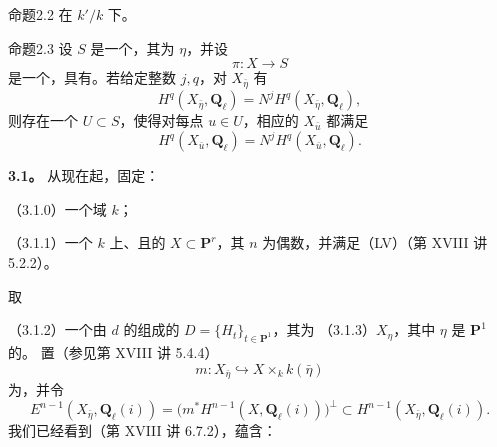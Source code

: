 \begin{SGAresult}{命题}{2.2}
在 $k'/k$ 下。
\end{SGAresult}
\begin{SGAresult}{命题}{2.3}
设 $S$ 是一个，其为 $\eta$，并设
\[\pi:X\longrightarrow S\]
是一个，具有。若给定整数 $j,q$，对 $X_{\bar\eta}$ 有
\begin{equation}\tag{2.3.1}
H^q(X_{\bar\eta},\mathbf Q_\ell)=N^jH^q(X_{\bar\eta},\mathbf Q_\ell),
\end{equation}
则存在一个 $U\subset S$，使得对每点 $u\in U$，相应的 $X_{\bar u}$ 都满足
\begin{equation}\tag{2.3.2}
H^q(X_{\bar u},\mathbf Q_\ell)=N^jH^q(X_{\bar u},\mathbf Q_\ell).
\end{equation}
\end{SGAresult}

\textbf{3.1。} 从现在起，固定：

\noindent（3.1.0）一个域 $k$；

\noindent（3.1.1）一个 $k$ 上、且的 $X\subset\mathbf P^r$，其 $n$ 为偶数，并满足（LV）（第 XVIII 讲 5.2.2）。

取

\noindent（3.1.2）一个由 $d$ 的组成的 $D=\{H_t\}_{t\in\mathbf P^1}$，其为
\noindent（3.1.3）$X_\eta$，其中 $\eta$ 是 $\mathbf P^1$ 的。
置（参见第 XVIII 讲 5.4.4）
\begin{equation}\tag{3.1.4}
m:X_{\bar\eta}\hookrightarrow X\times_k k(\bar\eta)
\end{equation}
为，并令
\begin{equation}\tag{3.1.5}
E^{n-1}(X_{\bar\eta},\mathbf Q_\ell(i))=\bigl(m^*H^{n-1}(X,\mathbf Q_\ell(i))\bigr)^\perp\subset H^{n-1}(X_{\bar\eta},\mathbf Q_\ell(i)).
\end{equation}
我们已经看到（第 XVIII 讲 6.7.2），蕴含：

